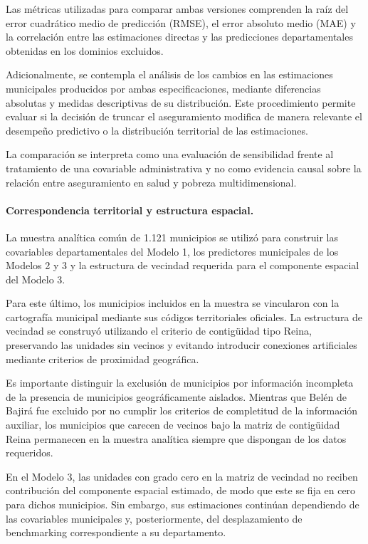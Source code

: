 Las métricas utilizadas para comparar ambas versiones comprenden la raíz del error cuadrático medio de predicción (RMSE), el error absoluto medio (MAE) y la correlación entre las estimaciones directas y las predicciones departamentales obtenidas en los dominios excluidos.

Adicionalmente, se contempla el análisis de los cambios en las estimaciones municipales producidos por ambas especificaciones, mediante diferencias absolutas y medidas descriptivas de su distribución. Este procedimiento permite evaluar si la decisión de truncar el aseguramiento modifica de manera relevante el desempeño predictivo o la distribución territorial de las estimaciones.

La comparación se interpreta como una evaluación de sensibilidad frente al tratamiento de una covariable administrativa y no como evidencia causal sobre la relación entre aseguramiento en salud y pobreza multidimensional.

\paragraph{Correspondencia territorial y estructura espacial.}

La muestra analítica común de 1.121 municipios se utilizó para construir las covariables departamentales del Modelo 1, los predictores municipales de los Modelos 2 y 3 y la estructura de vecindad requerida para el componente espacial del Modelo 3.

Para este último, los municipios incluidos en la muestra se vincularon con la cartografía municipal mediante sus códigos territoriales oficiales. La estructura de vecindad se construyó utilizando el criterio de contigüidad tipo Reina, preservando las unidades sin vecinos y evitando introducir conexiones artificiales mediante criterios de proximidad geográfica.

Es importante distinguir la exclusión de municipios por información incompleta de la presencia de municipios geográficamente aislados. Mientras que Belén de Bajirá fue excluido por no cumplir los criterios de completitud de la información auxiliar, los municipios que carecen de vecinos bajo la matriz de contigüidad Reina permanecen en la muestra analítica siempre que dispongan de los datos requeridos.

En el Modelo 3, las unidades con grado cero en la matriz de vecindad no reciben contribución del componente espacial estimado, de modo que este se fija en cero para dichos municipios. Sin embargo, sus estimaciones continúan dependiendo de las covariables municipales y, posteriormente, del desplazamiento de benchmarking correspondiente a su departamento.

